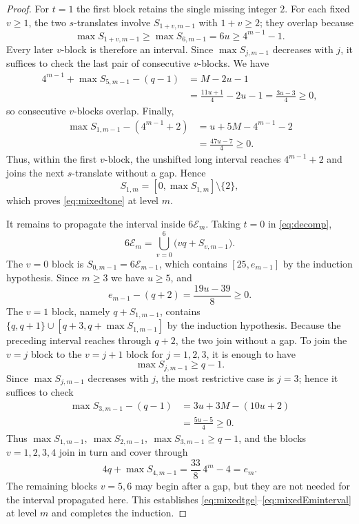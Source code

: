 \documentclass[12pt]{article}
\theoremstyle{plain}
\begin{document}
\begin{proof}
For $t=1$ the first block retains the single missing integer $2$.  For
each fixed $v\geq1$, the two $s$-translates involve $S_{1+v,m-1}$ with
$1+v\geq2$; they overlap because
\[
 \max S_{1+v,m-1}\geq\max S_{6,m-1}=6u\geq4^{m-1}-1.
\]
Every later $v$-block is therefore an interval.  Since $\max S_{j,m-1}$
decreases with $j$, it suffices to check the last pair of consecutive
$v$-blocks.  We have
\[
\begin{aligned}
 4^{m-1}+\max S_{5,m-1}-(q-1)
 &=M-2u-1\\
 &=\frac{11u+1}{4}-2u-1
  =\frac{3u-3}{4}\geq0,
\end{aligned}
\]
so consecutive $v$-blocks overlap.  Finally,
\[
\begin{aligned}
 \max S_{1,m-1}-(4^{m-1}+2)
 &=u+5M-4^{m-1}-2\\
 &=\frac{47u-7}{4}\geq0.
\end{aligned}
\]
Thus, within the first $v$-block, the unshifted long interval reaches
$4^{m-1}+2$ and joins the next $s$-translate without a gap.  Hence
\[
 S_{1,m}=[0,\max S_{1,m}]\setminus\{2\},
\]
which proves \eqref{eq:mixedtone} at level $m$.

It remains to propagate the interval inside $6\mathcal E_m$.  Taking
$t=0$ in \eqref{eq:decomp},
\[
 6\mathcal E_m=\bigcup_{v=0}^{6}\bigl(vq+S_{v,m-1}\bigr).
\]
The $v=0$ block is $S_{0,m-1}=6\mathcal E_{m-1}$, which contains
$[25,e_{m-1}]$ by the induction hypothesis.  Since $m\geq3$ we have
$u\geq5$, and
\[
 e_{m-1}-(q+2)=\frac{19u-39}{8}\geq0 .
\]
The $v=1$ block, namely $q+S_{1,m-1}$, contains
$\{q,q+1\}\cup[q+3,q+\max S_{1,m-1}]$ by the induction hypothesis.
Because the preceding interval reaches through $q+2$, the two join
without a gap.  To join the $v=j$ block to the $v=j+1$ block for
$j=1,2,3$, it is enough to have
\[
 \max S_{j,m-1}\geq q-1.
\]
Since $\max S_{j,m-1}$ decreases with $j$, the most restrictive case is
$j=3$; hence it suffices to check
\[
\begin{aligned}
 \max S_{3,m-1}-(q-1)
 &=3u+3M-(10u+2)\\
 &=\frac{5u-5}{4}\geq0 .
\end{aligned}
\]
Thus $\max S_{1,m-1},\ \max S_{2,m-1},\ \max S_{3,m-1}\geq q-1$, and
the blocks $v=1,2,3,4$ join in turn and cover through
\[
 4q+\max S_{4,m-1}=\frac{33}{8}\,4^m-4=e_m .
\]
The remaining blocks $v=5,6$ may begin after a gap, but they are not
needed for the interval propagated here.  This establishes
\eqref{eq:mixedtge}--\eqref{eq:mixedEminterval} at level $m$ and
completes the induction.
\end{proof}
\end{document}
